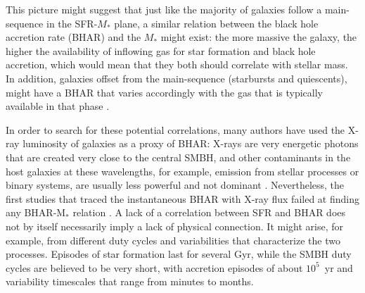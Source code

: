     This picture might suggest that just like the majority of galaxies follow a main-sequence in the SFR-$M_*$ plane, a similar relation between the black hole accretion rate (BHAR) and the $M_*$ might exist: the more massive the galaxy, the higher the availability of inflowing gas for star formation and black hole accretion, which would mean that they both should correlate with stellar mass. In addition, galaxies offset from the main-sequence (starbursts and quiescents), might have a BHAR that varies accordingly with the gas that is typically available in that phase \citep{2019ApJ...877L..38R}. 
    
    In order to search for these potential correlations, many authors have used the X-ray luminosity of galaxies as a proxy of BHAR: X-rays are very energetic photons that are created very close to the central SMBH, and other contaminants in the host galaxies at these wavelengths, for example, emission from stellar processes or binary systems, are usually less powerful and not dominant \citep[e.g.][]{2015A&ARv..23....1B}. Nevertheless, the first studies that traced the instantaneous BHAR with X-ray flux failed at finding any BHAR-M$_*$ relation \citep{2009ApJ...696..396S, 2010A&A...518L..26S, 2012MNRAS.419...95M, 2012A&A...545A..45R, 2015ApJ...806..187A}. A lack of a correlation between SFR and BHAR does not by itself necessarily imply a lack of physical connection. It might arise, for example, from different duty cycles and variabilities that characterize the two processes.  
    Episodes of star formation last for several Gyr, while the SMBH duty cycles are believed to be very short, with accretion episodes of about $10^5$~yr and variability timescales that range from minutes to months.
    
